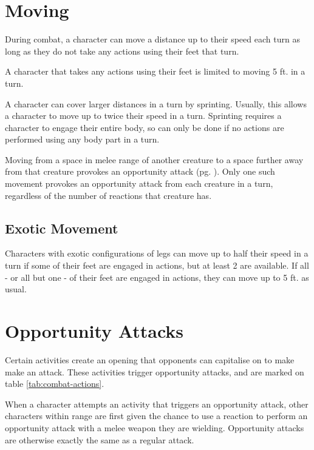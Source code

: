 \begin{multicols*}{2}
    \section{Moving}\label{combat:moving}
    During combat, a character can move a distance up to their speed each turn
    as long as they do not take any actions using their feet that turn.

    A character that takes any actions using their feet is limited to moving
    5 ft. in a turn.

    A character can cover larger distances in a turn by sprinting. Usually,
    this allows a character to move up to twice their speed in a turn.
    Sprinting requires a character to engage their entire body, so can only be
    done if no actions are performed using any body part in a turn.

    Moving from a space in melee range of another creature to a space further
    away from that creature provokes an opportunity attack (pg.
    \pageref{combat:opportunity-attacks}). Only one such movement provokes an
    opportunity attack from each creature in a turn, regardless of the number
    of reactions that creature has.

    \subsection{Exotic Movement}
    Characters with exotic configurations of legs can move up to half their
    speed in a turn if some of their feet are engaged in actions, but at least
    2 are available. If all - or all but one - of their feet are engaged in actions,
    they can move up to 5 ft. as usual.

    \section{Opportunity Attacks}\label{combat:opportunity-attacks}
    Certain activities create an opening that opponents can capitalise on to
    make make an attack. These activities trigger opportunity attacks, and
    are marked on table \ref{tab:combat-actions}.

    When a character attempts an activity that triggers an opportunity attack,
    other characters within range are first given the chance to use a reaction
    to perform an opportunity attack with a melee weapon they are wielding.
    Opportunity attacks are otherwise exactly the same as a regular attack.


\end{multicols*}
